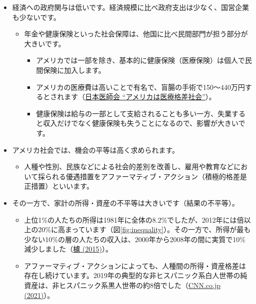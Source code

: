 \documentclass[
]{book}
\providecommand{\tightlist}{%
  \setlength{\itemsep}{0pt}\setlength{\parskip}{0pt}}
\begin{document}
\begin{itemize}
\item
  経済への政府関与は低いです。経済規模に比べ政府支出は少なく、国営企業も少ないです。

  \begin{itemize}
  \item
    年金や健康保険といった社会保障は、他国に比べ民間部門が担う部分が大きいです。

    \begin{itemize}
    \item
      アメリカでは一部を除き、基本的に健康保険（医療保険）は個人で民間保険に加入します。
    \item
      アメリカの医療費は高いことで有名で、盲腸の手術で150～440万円するとされます（\href{https://www.med.or.jp/people/info/kaifo/compare/\#:~:text=\%E5\%9C\%A8\%E3\%83\%8B\%E3\%83\%A5\%E3\%83\%BC\%E3\%83\%A8\%E3\%83\%BC\%E3\%82\%AF\%E7\%B7\%8F\%E9\%A0\%98\%E4\%BA\%8B\%E9\%A4\%A8\%E3\%81\%AE,\%E3\%82\%92\%E6\%B1\%BA\%E5\%AE\%9A\%E3\%81\%97\%E3\%81\%A6\%E3\%81\%84\%E3\%81\%BE\%E3\%81\%99\%EF\%BC\%89\%E3\%80\%82}{日本医師会 ``アメリカは医療格差社会''}）。
    \item
      健康保険は給与の一部として支給されることも多い一方、失業すると収入だけでなく健康保険も失うことになるので、影響が大きいです。
    \end{itemize}
  \end{itemize}
\item
  アメリカ社会では、機会の平等は高く求められます。

  \begin{itemize}
  \tightlist
  \item
    人種や性別、民族などによる社会的差別を改善し、雇用や教育などにおいて採られる優遇措置をアファーマティブ・アクション（積極的格差是正措置）といいます。
  \end{itemize}
\item
  その一方で、家計の所得・資産の不平等は大きいです（結果の不平等）。

  \begin{itemize}
  \item
    上位1\%の人たちの所得は1981年に全体の8.2\%でしたが、2012年には倍以上の20\%に高まっています（図\ref{fig:inequality}）。その一方で、所得が最も少ない10\%の層の人たちの収入は、2000年から2008年の間に実質で10\%減少しました（\href{https://www.nli-research.co.jp/report/detail/id=42347?site=nli}{櫨 (2015)}）。
  \item
    アファーマティブ・アクションによっても、人種間の所得・資産格差は存在し続けています。2019年の典型的な非ヒスパニック系白人世帯の純資産は、非ヒスパニック系黒人世帯の約8倍でした（\href{https://www.cnn.co.jp/business/35172251.html}{CNN.co.jp (2021)}）。
  \end{itemize}
\end{itemize}
\end{document}
